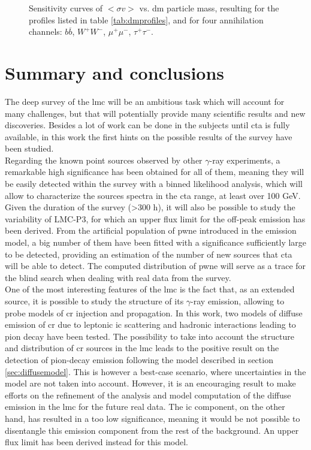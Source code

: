 \documentclass[main.tex]{subfiles}
\begin{document}
\begin{figure}
\endminipage
  \caption{Sensitivity curves of $<\sigma v >$ vs. \gls{dm} particle mass, resulting for the profiles listed in table \ref{tab:dmprofiles}, and for four annihilation channels: $b\overline b$, $W^+W^-$, $\mu^+ \mu^-$, $\tau^+ \tau^-$.}
    \label{fig:dmsensicurves}
\end{figure}

\section{Summary and conclusions}

The deep survey of the \gls{lmc} will be an ambitious task which will account for many challenges, but that will potentially provide many scientific results and new discoveries. Besides a lot of work can be done in the subjects until \gls{cta} is fully available, in this work the first hints on the possible results of the survey have been studied.\\
Regarding the known point sources observed by other $\gamma$-ray experiments, a remarkable high significance has been obtained for all of them, meaning they will be easily detected within the survey with a binned likelihood analysis, which will allow to characterize the sources spectra in the \gls{cta} range, at least over 100 GeV. Given the duration of the survey (>300 h), it will also be possible to study the variability of LMC-P3, for which an upper flux limit for the off-peak emission has been derived. From the artificial population of \gls{pwne} introduced in the emission model, a big number of them have been fitted with a significance sufficiently large to be detected, providing an estimation of the number of new sources that \gls{cta} will be able to detect. The computed distribution of \gls{pwne} will serve as a trace for the blind search when dealing with real data from the survey.\\
One of the most interesting features of the \gls{lmc} is the fact that, as an extended source, it is possible to study the structure of its $\gamma$-ray emission, allowing to probe models of \gls{cr} injection and propagation. In this work, two models of diffuse emission of \gls{cr} due to leptonic \gls{ic} scattering and hadronic interactions leading to pion decay have been tested. The possibility to take into account the structure and distribution of \gls{cr} sources in the \gls{lmc} leads to the positive result on the detection of pion-decay emission following the model described in section \ref{sec:diffusemodel}. This is however a best-case scenario, where uncertainties in the model are not taken into account. However, it is an encouraging result to make efforts on the refinement of the analysis and model computation of the diffuse emission in the \gls{lmc} for the future real data. The \gls{ic} component, on the other hand, has resulted in a too low significance, meaning it would be not possible to disentangle this emission component from the rest of the background. An upper flux limit has been derived instead for this model.\\
\end{document}
